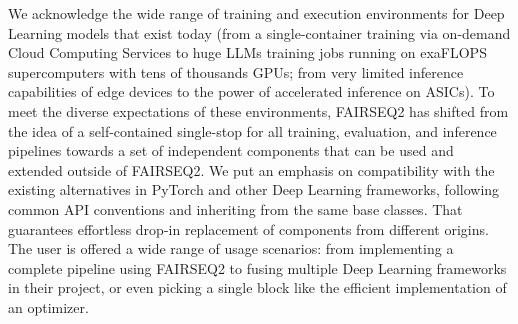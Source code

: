 We acknowledge the wide range of training and execution environments for Deep Learning models that exist today (from a single-container training via on-demand Cloud Computing Services to huge LLMs training jobs running on exaFLOPS supercomputers with tens of thousands GPUs; from very limited inference capabilities of edge devices to the power of accelerated inference on ASICs). To meet the diverse expectations of these environments, FAIRSEQ2 has shifted from the idea of a self-contained single-stop for all training, evaluation, and inference pipelines towards a set of independent components that can be used and extended outside of FAIRSEQ2. We put an emphasis on compatibility with the existing alternatives in PyTorch and other Deep Learning frameworks, following common API conventions and inheriting from the same base classes. That guarantees effortless drop-in replacement of components from different origins. The user is offered a wide range of usage scenarios: from implementing a complete pipeline using FAIRSEQ2 to fusing multiple Deep Learning frameworks in their project, or even picking a single block like the efficient implementation of an optimizer.
